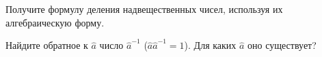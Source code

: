 \begin{task} Получите формулу деления надвещественных чисел, используя их алгебраическую форму.\end{task}
\begin{task} Найдите обратное к $\hat{a}$ число $\hat{a}^{-1}$ ($\hat{a}\hat{a}^{-1}=1$). Для каких $\hat{a}$ оно существует?\end{task}
